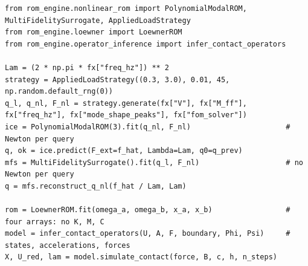 \begin{lstlisting}[caption={A hybrid nonlinear modal ROM, a Loewner fit and an operator-inference fit (fx: fixture with modes V, mass matrix, frequencies and a full-order solver).},label={lst:ni-run}]
from rom_engine.nonlinear_rom import PolynomialModalROM, MultiFidelitySurrogate, AppliedLoadStrategy
from rom_engine.loewner import LoewnerROM
from rom_engine.operator_inference import infer_contact_operators

Lam = (2 * np.pi * fx["freq_hz"]) ** 2
strategy = AppliedLoadStrategy((0.3, 3.0), 0.01, 45, np.random.default_rng(0))
q_l, q_nl, F_nl = strategy.generate(fx["V"], fx["M_ff"], fx["freq_hz"], fx["mode_shape_peaks"], fx["fom_solver"])
ice = PolynomialModalROM(3).fit(q_nl, F_nl)                      # Newton per query
q, ok = ice.predict(F_ext=f_hat, Lambda=Lam, q0=q_prev)
mfs = MultiFidelitySurrogate().fit(q_l, F_nl)                    # no Newton per query
q = mfs.reconstruct_q_nl(f_hat / Lam, Lam)

rom = LoewnerROM.fit(omega_a, omega_b, x_a, x_b)                 # four arrays: no K, M, C
model = infer_contact_operators(U, A, F, boundary, Phi, Psi)     # states, accelerations, forces
X, U_red, lam = model.simulate_contact(force, B, c, h, n_steps)
\end{lstlisting}

